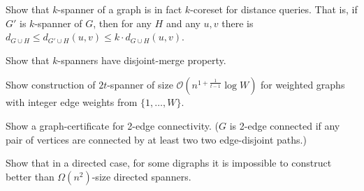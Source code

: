 \documentclass[12pt]{uebung}
\begin{document}
 

\newcommand{\bigo}{\mathcal{O}}
\renewcommand{\aufgname}{Exercise}
\begin{aufg}
Show that $k$-spanner of a graph is in fact $k$-coreset for distance queries. That is, if $G'$ is $k$-spanner of $G$, then for any $H$ and any $u,v$ there is $d_{G \cup H} \le d_{G' \cup H}(u,v) \le k \cdot d_{G \cup H}(u,v)$.
\end{aufg}

\begin{aufg}
Show that $k$-spanners have disjoint-merge property.
\end{aufg}

\begin{aufg}
Show construction of $2t$-spanner of size $\bigo(n^{1+\frac{1}{t-1}} \log W)$ for weighted graphs with integer edge weights from $\{1,\ldots,W\}$.
\end{aufg}

\begin{aufg}
Show a graph-certificate for 2-edge connectivity. ($G$ is 2-edge connected if any pair of vertices are connected by at least two two edge-disjoint paths.)
\end{aufg}

\begin{aufg}
Show that in a directed case, for some digraphs it is impossible to construct better than $\Omega(n^2)$-size directed spanners.
\end{aufg}
\end{document}
